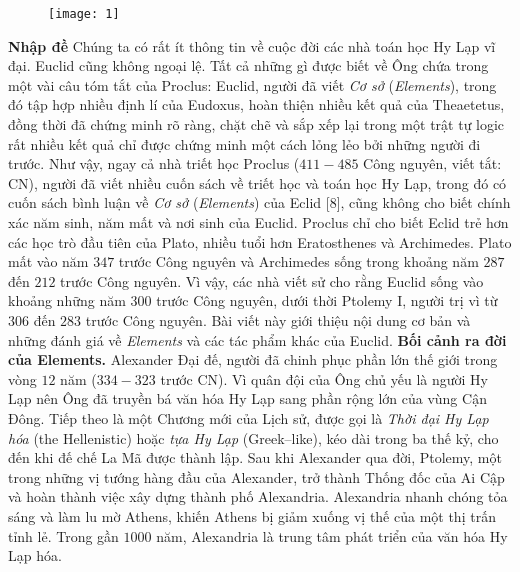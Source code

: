\begin{multicols}{2}
	\begin{figure}[H]
		\vspace*{5pt}
		\centering
		\captionsetup{labelformat= empty, justification=centering}
		\texttt{[image: 1]}
		\vspace*{-15pt}
	\end{figure}
	\textbf{\color{lichsutoanhoc}Nhập đề}
	\vskip 0.1cm
	Chúng ta có rất ít thông tin về cuộc đời các nhà toán học Hy Lạp vĩ đại. Euclid cũng không ngoại lệ. Tất cả những gì được biết về Ông chứa trong một vài câu tóm tắt của Proclus: Euclid, người đã viết \textit{Cơ sở} (\textit{Elements}), trong đó tập hợp nhiều định lí của Eudoxus, hoàn thiện nhiều kết quả của Theaetetus, đồng thời đã chứng minh rõ ràng, chặt chẽ và sắp xếp lại trong một trật tự logic rất nhiều kết quả chỉ được chứng minh một cách lỏng lẻo bởi những người đi trước.
	\vskip 0.1cm
	Như vậy, ngay cả nhà triết học Proclus ($411-485$ Công nguyên, viết tắt: CN), người đã viết nhiều cuốn sách về triết học và toán học Hy Lạp, trong đó có cuốn sách bình luận về \textit{Cơ sở} (\textit{Elements}) của Eclid [$8$], cũng không cho biết chính xác năm sinh, năm mất và nơi sinh của Euclid. Proclus chỉ cho biết Eclid trẻ hơn các học trò đầu tiên của Plato, nhiều tuổi hơn Eratosthenes và Archimedes. Plato mất vào năm $347$ trước Công nguyên và Archimedes sống trong khoảng năm $287$ đến $212$ trước Công nguyên. Vì vậy, các nhà viết sử cho rằng Euclid sống vào khoảng những năm $300$ trước Công nguyên, dưới thời Ptolemy I, người trị vì từ $306$ đến $283$ trước Công nguyên. 
	\vskip 0.1cm
	Bài viết này giới thiệu nội dung cơ bản và những đánh giá về \textit{Elements} và các tác phẩm khác của Euclid. 
	\vskip 0.1cm
	\textbf{\color{lichsutoanhoc}Bối cảnh ra đời của Elements.}
	Alexander Đại đế, người đã chinh phục phần lớn thế giới trong vòng $12$ năm ($334-323$ trước CN). Vì quân đội của Ông chủ yếu là người Hy Lạp nên Ông đã truyền bá văn hóa Hy Lạp sang phần rộng lớn của vùng Cận Đông. Tiếp theo là một Chương mới của Lịch sử, được gọi là \textit{Thời đại Hy Lạp hóa} (the Hellenistic) hoặc \textit{tựa Hy Lạp} (Greek--like), kéo dài trong ba thế kỷ, cho đến khi đế chế La Mã được thành lập.
	\vskip 0.1cm
	Sau khi Alexander qua đời, Ptolemy, một trong những vị tướng hàng đầu của Alexander, trở thành Thống đốc của Ai Cập và hoàn thành việc xây dựng thành phố Alexandria. Alexandria nhanh chóng tỏa sáng và làm lu mờ Athens, khiến Athens bị giảm xuống vị thế của một thị trấn tỉnh lẻ. Trong gần $1000$ năm, Alexandria là trung tâm phát triển của văn hóa Hy Lạp hóa.

\end{multicols}
